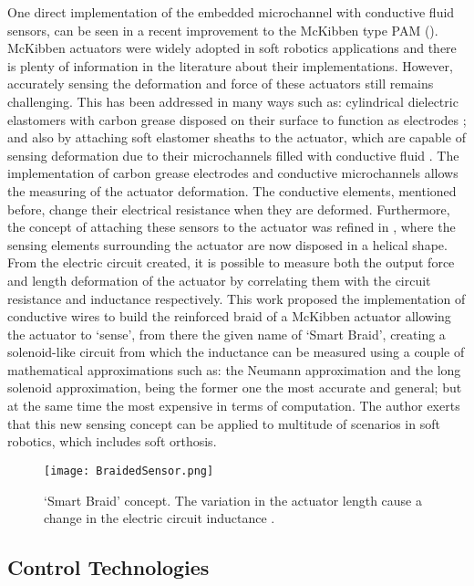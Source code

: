 One direct implementation of the embedded microchannel with conductive fluid sensors, can be seen in a recent improvement to the McKibben type PAM (). McKibben actuators were widely adopted in soft robotics applications and there is plenty of information in the literature about their implementations. However, accurately sensing the deformation and force of these actuators still remains challenging. This has been addressed in many ways such as: cylindrical dielectric elastomers with carbon grease disposed on their surface to function as electrodes \cite{Goulbourne2007}; and also by attaching soft elastomer sheaths to the actuator, which are capable of sensing deformation due to their microchannels filled with conductive fluid \cite{Park2013}. The implementation of carbon grease electrodes and conductive microchannels allows the measuring of the actuator deformation. The conductive elements, mentioned before, change their electrical resistance when they are deformed. Furthermore, the concept of attaching these sensors to the actuator was refined in \cite{Felt2014,Felt2015}, where the sensing elements surrounding the actuator are now disposed in a helical shape. From the electric circuit created, it is possible to measure both the output force and length deformation of the actuator by correlating them with the circuit resistance and inductance respectively. This work proposed the implementation of conductive wires to build the reinforced braid of a McKibben actuator allowing the actuator to `sense', from there the given name of `Smart Braid', creating a solenoid-like circuit from which the inductance can be measured using a couple of mathematical approximations such as: the Neumann approximation and the long solenoid approximation, being the former one the most accurate and general; but at the same time the most expensive in terms of computation. The author exerts that this new sensing concept can be applied to multitude of scenarios in soft robotics, which includes soft orthosis.
\begin{figure}[hbtp!]
    \centering
    \texttt{[image: BraidedSensor.png]}
    \caption[`Smart Braid' concept. The variation in the actuator length cause a change in the electric circuit inductance.]{`Smart Braid' concept. The variation in the actuator length cause a change in the electric circuit inductance \cite{Felt2015}. }
    \label{fig:braided_sensor}
\end{figure}

\subsection{Control Technologies} \label{sec:controlSystems}


